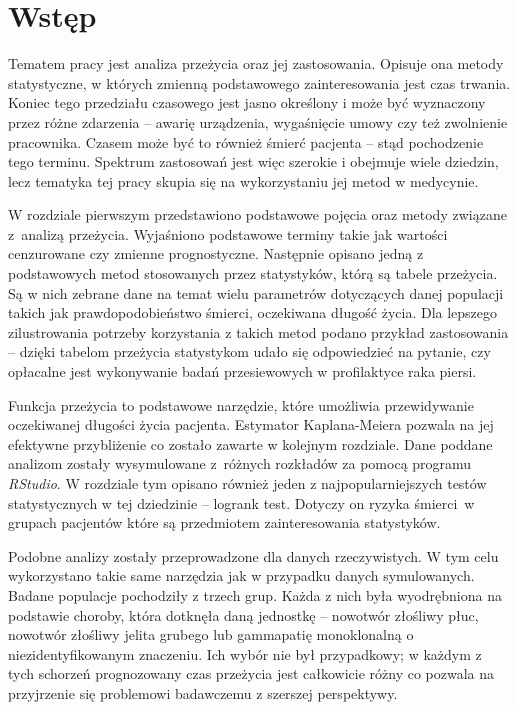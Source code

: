 \documentclass[licencjacka]{pwr_wmat_praca_dyplomowa}
\theoremstyle{plain}
\numberwithin{theorem}{chapter}
\theoremstyle{definition}
\numberwithin{theorem}{chapter}
\begin{document}
\frontmatter
\let\cleardoublepage\clearpage

\maketitle
\mainmatter
\tableofcontents
\listoffigures
\listoftables

{\backmatter \chapter{Wstęp}}

Tematem pracy jest analiza przeżycia oraz jej zastosowania. Opisuje ona metody statystyczne, w których zmienną podstawowego zainteresowania jest czas trwania. Koniec tego przedziału czasowego jest jasno określony i może być wyznaczony przez różne zdarzenia -- awarię urządzenia, wygaśnięcie umowy czy też zwolnienie pracownika. Czasem może być to również śmierć pacjenta -- stąd pochodzenie tego terminu.
Spektrum zastosowań jest więc szerokie i obejmuje wiele dziedzin, lecz tematyka tej pracy skupia się na wykorzystaniu jej metod w medycynie. 

W rozdziale pierwszym przedstawiono podstawowe pojęcia oraz metody związane z~analizą przeżycia. Wyjaśniono podstawowe terminy takie jak wartości cenzurowane czy zmienne prognostyczne. Następnie opisano jedną z podstawowych metod stosowanych przez statystyków, którą są tabele przeżycia. Są w nich zebrane dane na temat wielu parametrów dotyczących danej populacji takich jak prawdopodobieństwo śmierci, oczekiwana długość życia. Dla lepszego zilustrowania potrzeby korzystania z takich metod podano przykład zastosowania -- dzięki tabelom przeżycia statystykom udało się odpowiedzieć na pytanie, czy opłacalne jest wykonywanie badań przesiewowych w profilaktyce raka piersi.

Funkcja przeżycia to podstawowe narzędzie, które umożliwia przewidywanie oczekiwanej długości życia pacjenta. Estymator Kaplana-Meiera pozwala na jej efektywne przybliżenie co zostało zawarte w kolejnym rozdziale. Dane poddane analizom zostały wysymulowane z~różnych rozkładów za pomocą programu \textit{RStudio}.  W rozdziale tym opisano również jeden z najpopularniejszych testów statystycznych w tej dziedzinie -- logrank test. Dotyczy on ryzyka śmierci~w grupach pacjentów które są przedmiotem zainteresowania statystyków.

Podobne analizy zostały przeprowadzone dla danych rzeczywistych. W tym celu wykorzystano takie same narzędzia jak w przypadku danych symulowanych. Badane populacje pochodziły z trzech grup. Każda z nich była wyodrębniona na podstawie choroby, która dotknęła daną jednostkę -- nowotwór złośliwy płuc, nowotwór złośliwy jelita grubego lub gammapatię monoklonalną o niezidentyfikowanym znaczeniu. Ich wybór nie był przypadkowy; w każdym z tych schorzeń prognozowany czas przeżycia jest całkowicie różny co pozwala na przyjrzenie się problemowi badawczemu z szerszej perspektywy.
\end{document}
